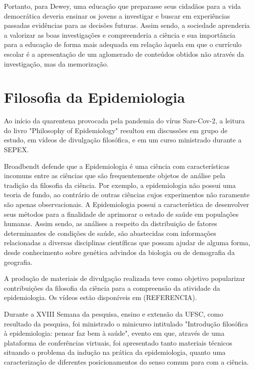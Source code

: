 \documentclass[12pt]{report}
\begin{document}
		Portanto, para Dewey, uma educação que preparasse seus cidadãos para a vida democrática deveria ensinar os jovens a investigar e buscar em experiências passadas evidências para as decisões futuras. Assim sendo, a sociedade aprenderia a valorizar as boas investigações e compreenderia a ciência e sua importância para a educação de forma mais adequada em relação àquela em que o currículo escolar é a apresentação de um aglomerado de conteúdos obtidos não através da investigação, mas da memorização.
	
	\section{Filosofia da Epidemiologia}
	
	 	Ao início da quarentena provocada pela pandemia do vírus Sars-Cov-2, a leitura do livro "Philosophy of Epidemiology" \cite{philosophy-of-epidemiology} resultou em discussões em grupo de estudo, em vídeos de divulgação filosófica, e em um curso ministrado durante a SEPEX.
	 	
	 	Broadbendt defende que a Epidemiologia é uma ciência com características incomuns entre as ciências que são frequentemente objetos de análise pela tradição da filosofia da ciência. Por exemplo, a epidemiologia não possui uma teoria de fundo, ao contrário de outras ciências cujos experimentos não raramente são apenas observacionais. A Epidemiologia possui a característica de desenvolver seus métodos para a finalidade de aprimorar o estado de saúde em populações humanas. Assim sendo, as análises a respeito da distribuição de fatores determinantes de condições de saúde, são abastecidas com informações relacionadas a diversas disciplinas científicas que possam ajudar de alguma forma, desde conhecimento sobre genética advindos da biologia ou de demografia da geografia.
	 	
	 	A produção de materiais de divulgação realizada teve como objetivo popularizar contribuições da filosofia da ciência para a compreensão da atividade da epidemiologia. Os vídeos estão disponíveis em (REFERENCIA).
	 	
	 	Durante a XVIII Semana da pesquisa, ensino e extensão da UFSC, como resultado da pesquisa, foi ministrado o minicurso intitulado "Introdução filosófica à epidemiologia: pensar faz bem à saúde", evento em que, através de uma plataforma de conferências virtuais, foi apresentado tanto materiais técnicos situando o problema da indução na prática da epidemiologia, quanto uma caracterização de diferentes posicionamentos do senso comum para com a ciência.
		
\end{document}
